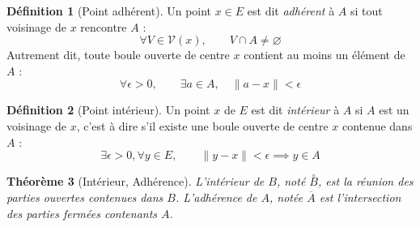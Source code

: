 \documentclass[11pt,a4paper]{report}
\newtheorem{theorem}{Théorème}[chapter]
\theoremstyle{definition}
\newtheorem{dfn}[theorem]{Définition}
\begin{document}
\begin{dfn}[Point adhérent]%
     Un point $x\in E$ est dit \emph{adhérent} à $A$ si tout voisinage de $x$ rencontre $A$ : 
     \begin{equation}
     \forall V\in \mathscr{V} (x),\qquad V\cap A \neq \varnothing
     \end{equation}
     Autrement dit, toute boule ouverte de centre $x$ contient au moins un élément de $A$ : 
     \begin{equation}
     \forall \epsilon > 0,\qquad \exists a\in A,\quad \| a -x \| < \epsilon
     \end{equation}
\end{dfn}

\begin{dfn}[Point intérieur]%
     Un point $x$ de $E$ est dit \emph{intérieur} à $A$ si $A$ est un voisinage de $x$, c'est à dire s'il existe une boule ouverte de centre $x$ contenue dans $A$ : 
     \begin{equation}
     \exists \epsilon > 0, \forall y\in E, \qquad \| y -x \| < \epsilon \implies y\in A
     \end{equation}
\end{dfn}
\begin{theorem}[Intérieur, Adhérence]%
L'\emph{intérieur} de $B$, noté $\overset{\circ}{B}$, est la \emph{réunion} des parties ouvertes \emph{contenues} dans $B$. \newline
L'\emph{adhérence} de $A$, notée $\overline{A}$ est \emph{l'intersection} des parties fermées \emph{contenants} $A$.
\end{theorem}
\end{document}
